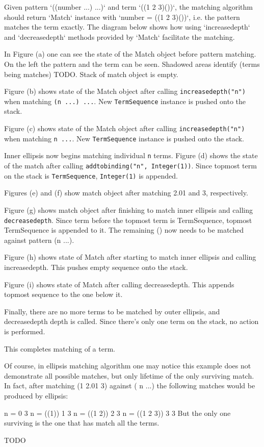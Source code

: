 Given pattern `((number ...) ...)` and term `((1 2 3)())`, the matching algorithm should return `Match` instance with `number = ((1 2 3)())`, i.e. the pattern matches the term exactly. The diagram below shows how using `increasedepth` and `decreasedepth` methods provided by `Match` facilitate the matching. 

In Figure (a) one can see the state of the Match object before pattern matching. On the left the pattern and the term can be seen. Shadowed areas identify (terms being matches) TODO.  Stack of match object is empty.

Figure (b) shows state of the Match object after calling \texttt{increasedepth("n")} when matching \texttt{(n ...) ...}. New \texttt{TermSequence} instance is pushed onto the stack.

Figure (c) shows state of the Match object after calling \texttt{increasedepth("n")} when matching \texttt{n ...}. New \texttt{TermSequence} instance is pushed onto the stack.

Inner ellipsis now begins matching individual \texttt{n} terms. Figure (d) shows the state of the match after calling \texttt{addtobinding("n", Integer(1))}. Since topmost term on the stack is \texttt{TermSequence}, \texttt{Integer(1)} is appended.

Figures (e) and (f) show match object after matching 2.01 and 3, respectively.

Figure (g) shows match object after finishing to match inner ellipsis and calling \texttt{decreasedepth}. Since term before the topmost term is TermSequence, topmost TermSequence is appended to it. The remaining () now needs to be matched against pattern (n ...).

Figure (h) shows state of Match after starting to match inner ellipsis and calling increasedepth. This pushes empty sequence onto the stack.

Figure (i) shows state of Match after calling decreasedepth. This appends topmost sequence to the one below it.

Finally, there are no more terms to be matched by outer ellipsis, and decreasedepth depth is called. Since there's only one term on the stack, no action is performed.

This completes matching of a term. 

Of course, in ellipsis matching algorithm one may notice this example does not demonstrate all possible matches, but only lifetime of the only surviving match. In fact, after matching (1 2.01 3) against ( n ...) the following matches would be produced by ellipsis:

n =         0 3
n = ((1))   1 3
n = ((1 2)) 2 3
n = ((1 2 3)) 3 3
But the only one surviving is the one that has match all the terms. 

TODO 
